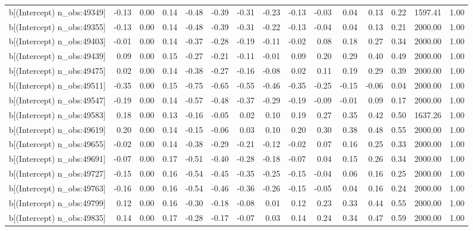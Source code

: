 \begin{table}[ht]
\begin{tabular}{rrrrrrrrrrrrrrr}
  b[(Intercept) n\_obs:49349] & -0.13 & 0.00 & 0.14 & -0.48 & -0.39 & -0.31 & -0.23 & -0.13 & -0.03 & 0.04 & 0.13 & 0.22 & 1597.41 & 1.00 \\ 
  b[(Intercept) n\_obs:49355] & -0.13 & 0.00 & 0.14 & -0.48 & -0.39 & -0.31 & -0.22 & -0.13 & -0.04 & 0.04 & 0.13 & 0.21 & 2000.00 & 1.00 \\ 
  b[(Intercept) n\_obs:49403] & -0.01 & 0.00 & 0.14 & -0.37 & -0.28 & -0.19 & -0.11 & -0.02 & 0.08 & 0.18 & 0.27 & 0.34 & 2000.00 & 1.00 \\ 
  b[(Intercept) n\_obs:49439] & 0.09 & 0.00 & 0.15 & -0.27 & -0.21 & -0.11 & -0.01 & 0.09 & 0.20 & 0.29 & 0.40 & 0.49 & 2000.00 & 1.00 \\ 
  b[(Intercept) n\_obs:49475] & 0.02 & 0.00 & 0.14 & -0.38 & -0.27 & -0.16 & -0.08 & 0.02 & 0.11 & 0.19 & 0.29 & 0.39 & 2000.00 & 1.00 \\ 
  b[(Intercept) n\_obs:49511] & -0.35 & 0.00 & 0.15 & -0.75 & -0.65 & -0.55 & -0.46 & -0.35 & -0.25 & -0.15 & -0.06 & 0.04 & 2000.00 & 1.00 \\ 
  b[(Intercept) n\_obs:49547] & -0.19 & 0.00 & 0.14 & -0.57 & -0.48 & -0.37 & -0.29 & -0.19 & -0.09 & -0.01 & 0.09 & 0.17 & 2000.00 & 1.00 \\ 
  b[(Intercept) n\_obs:49583] & 0.18 & 0.00 & 0.13 & -0.16 & -0.05 & 0.02 & 0.10 & 0.19 & 0.27 & 0.35 & 0.42 & 0.50 & 1637.26 & 1.00 \\ 
  b[(Intercept) n\_obs:49619] & 0.20 & 0.00 & 0.14 & -0.15 & -0.06 & 0.03 & 0.10 & 0.20 & 0.30 & 0.38 & 0.48 & 0.55 & 2000.00 & 1.00 \\ 
  b[(Intercept) n\_obs:49655] & -0.02 & 0.00 & 0.14 & -0.38 & -0.29 & -0.21 & -0.12 & -0.02 & 0.07 & 0.16 & 0.25 & 0.33 & 2000.00 & 1.00 \\ 
  b[(Intercept) n\_obs:49691] & -0.07 & 0.00 & 0.17 & -0.51 & -0.40 & -0.28 & -0.18 & -0.07 & 0.04 & 0.15 & 0.26 & 0.34 & 2000.00 & 1.00 \\ 
  b[(Intercept) n\_obs:49727] & -0.15 & 0.00 & 0.16 & -0.54 & -0.45 & -0.35 & -0.25 & -0.15 & -0.04 & 0.06 & 0.16 & 0.25 & 2000.00 & 1.00 \\ 
  b[(Intercept) n\_obs:49763] & -0.16 & 0.00 & 0.16 & -0.54 & -0.46 & -0.36 & -0.26 & -0.15 & -0.05 & 0.04 & 0.16 & 0.24 & 2000.00 & 1.00 \\ 
  b[(Intercept) n\_obs:49799] & 0.12 & 0.00 & 0.16 & -0.30 & -0.18 & -0.08 & 0.01 & 0.12 & 0.23 & 0.33 & 0.44 & 0.55 & 2000.00 & 1.00 \\ 
  b[(Intercept) n\_obs:49835] & 0.14 & 0.00 & 0.17 & -0.28 & -0.17 & -0.07 & 0.03 & 0.14 & 0.24 & 0.34 & 0.47 & 0.59 & 2000.00 & 1.00 \\ 

\end{tabular}
\end{table}
